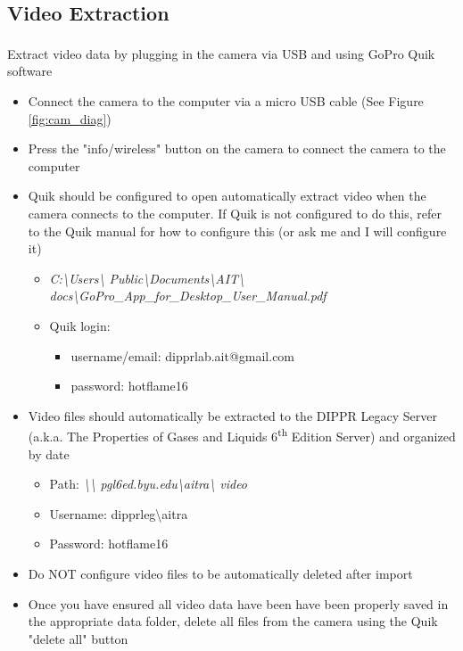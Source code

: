 \documentclass[letterpaper,11pt]{article}
\begin{document}
\subsection{Video Extraction} \label{sec:vid_ex}
Extract video data by plugging in the camera via USB and using 
GoPro\textsuperscript{\textcopyright} Quik software
    \begin{itemize}
    \item Connect the camera to the computer via a micro USB cable (See 
        Figure \ref{fig:cam_diag})
    \item Press the "info/wireless" button on the camera to connect the 
        camera to the computer
    \item Quik should be configured to open automatically extract video 
        when the camera connects to the computer. If Quik is not configured 
        to do this, refer to the Quik manual for how to configure this 
        (or ask me and I will configure it)
        \begin{itemize}
        \item \textit{C:\textbackslash Users\textbackslash 
            Public\textbackslash Documents\textbackslash AIT\textbackslash 
            docs\textbackslash GoPro\_App\_for\_Desktop\_User\_Manual.pdf}
        \item Quik login:
            \begin{itemize}
            \item username/email: dipprlab.ait@gmail.com
            \item password: hotflame16
            \end{itemize}
        \end{itemize}
    \item Video files should automatically be extracted to the DIPPR  
        Legacy Server (a.k.a. The Properties of Gases and Liquids  
        6\textsuperscript{th} Edition Server) and organized by date
        \begin{itemize}
        \item Path: \textit{\textbackslash \textbackslash 
           pgl6ed.byu.edu\textbackslash aitra\textbackslash 
           video}
        \item Username: dipprleg\textbackslash aitra
        \item Password: hotflame16
        \end{itemize}
    \item Do NOT configure video files to be automatically deleted after 
        import
    \item Once you have ensured all video data have been have been properly
        saved in the appropriate data folder, delete all files from the 
        camera using the Quik "delete all" button
    \end{itemize}
\end{document}
